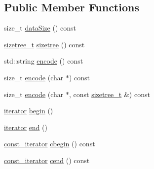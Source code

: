 \subsection*{Public Member Functions}
\begin{DoxyCompactItemize}
\item 
size\+\_\+t \mbox{\hyperlink{classebml_1_1ebmlMasterElement_ae396f9a2f9e0e86b7f6d20505b88352c}{data\+Size}} () const
\item 
\mbox{\hyperlink{structebml_1_1sizetree__t}{sizetree\+\_\+t}} \mbox{\hyperlink{classebml_1_1ebmlMasterElement_a144f54d1231432975a47f4f83fd2e068}{sizetree}} () const
\item 
std\+::string \mbox{\hyperlink{classebml_1_1ebmlMasterElement_a2016b30a9ac7d48e990a6a864138a362}{encode}} () const
\item 
size\+\_\+t \mbox{\hyperlink{classebml_1_1ebmlMasterElement_ac0bc9d595746939fea3e30b810d89c9f}{encode}} (char $\ast$) const
\item 
size\+\_\+t \mbox{\hyperlink{classebml_1_1ebmlMasterElement_af9c776725a15ddff8a66d6c42bb7610f}{encode}} (char $\ast$, const \mbox{\hyperlink{structebml_1_1sizetree__t}{sizetree\+\_\+t}} \&) const
\item 
\mbox{\hyperlink{classebml_1_1ebmlMasterElement_1_1iterator}{iterator}} \mbox{\hyperlink{classebml_1_1ebmlMasterElement_aee8637a10705708acad5add971ac6999}{begin}} ()
\item 
\mbox{\hyperlink{classebml_1_1ebmlMasterElement_1_1iterator}{iterator}} \mbox{\hyperlink{classebml_1_1ebmlMasterElement_a9859bf4ba74c58ccc0eef1c9f6017719}{end}} ()
\item 
\mbox{\hyperlink{classebml_1_1ebmlMasterElement_1_1const__iterator}{const\+\_\+iterator}} \mbox{\hyperlink{classebml_1_1ebmlMasterElement_af8869286e051067d82fad936eb0c7a74}{cbegin}} () const
\item 
\mbox{\hyperlink{classebml_1_1ebmlMasterElement_1_1const__iterator}{const\+\_\+iterator}} \mbox{\hyperlink{classebml_1_1ebmlMasterElement_a7e4fa27c47c71e99615452dc4e1e3190}{cend}} () const
\end{DoxyCompactItemize}
